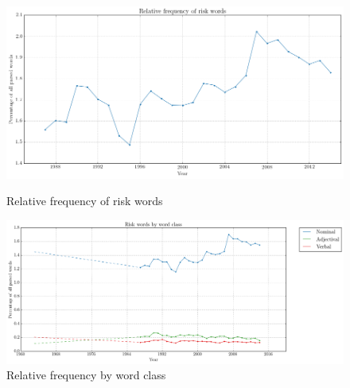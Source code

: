           \noindent
          \begin{figure}[htb!]
          \centering
          \begin{minipage}{.45\textwidth}
            \centering
                      \includegraphics[width=.95\textwidth]{../images/relative_frequency_of_risk_words.png}
                      \caption{Relative frequency of risk words}
                      \label{fig:relative_frequency_of_risk_words}
          \end{minipage}%
          \begin{minipage}{.55\textwidth}
            \centering
                      \includegraphics[width=.95\textwidth]{../images/risk_words_by_word_class.png}
                      \caption{Relative frequency by word class}
                      \label{fig:wordclasses}
          \end{minipage}
          \end{figure}




